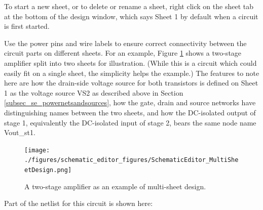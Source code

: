 To start a new sheet, or to delete or rename a sheet, right click on the sheet tab at the bottom of the design window, which says \textsf{Sheet 1} by default when a circuit is first started.  

Use the power pins and wire labels to ensure correct connectivity between the circuit parts on different sheets.  For an example, Figure \ref{fig_schematiceditor_multisheetexample} shows a two-stage amplifier split into two sheets for illustration.  (While this is a circuit which could easily fit on a single sheet, the simplicity helps the example.)  The features to note here are how the drain-side voltage source for both transistors is defined on Sheet 1 as the voltage source \textsf{VS2} as described above in Section \ref{subsec_se_powernetsandsources}, how the gate, drain and source networks have distinguishing names between the two sheets, and how the DC-isolated output of stage 1, equivalently the DC-isolated input of stage 2, bears the same node name \textsf{Vout\_st1}. 

\begin{figure}[thb]
\centering
  \texttt{[image: ./figures/schematic\_editor\_figures/SchematicEditor\_MultiSheetDesign.png]}
  \caption{A two-stage amplifier as an example of multi-sheet design.}
  \label{fig_schematiceditor_multisheetexample}
\end{figure}

Part of the netlist for this circuit is shown here:


